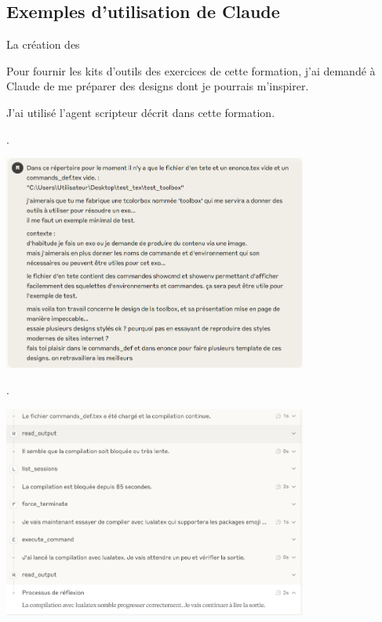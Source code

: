 \subsection{Exemples d'utilisation de Claude}

\begin{bfbox}{La création des }

    Pour fournir les kits d'outils des exercices de cette formation, j'ai demandé à Claude de me préparer des designs dont je pourrais m'inspirer. 

    J'ai utilisé l'agent scripteur décrit dans cette formation. 

    \begin{tcbenumerate}[2]
        \tcbitem {}. 
        \begin{center}
        \includegraphics[width=0.75\textwidth]{annexes/Example_craft_toolbox/1.png}
        \end{center}
        
        \tcbitem {}. 
        \begin{center}
        \includegraphics[width=0.75\textwidth]{annexes/Example_craft_toolbox/3.png}
        \end{center}


\end{tcbenumerate}
\end{bfbox}
